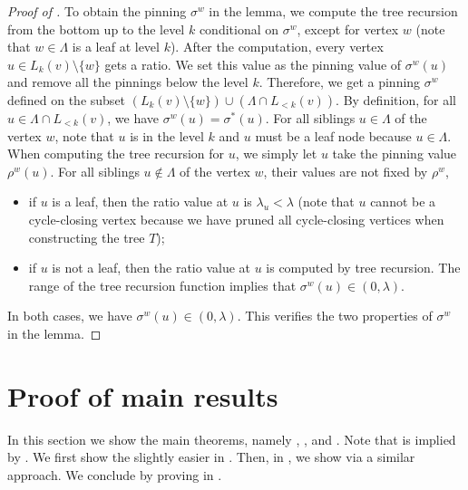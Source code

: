 \documentclass[11pt]{amsart}
\theoremstyle{definition}
\theoremstyle{remark}
\begin{document}
\begin{proof}[Proof of ]
To obtain the pinning $\sigma^w$ in the lemma, we compute the tree recursion from the bottom up to the level $k$ conditional on $\sigma^w$, except for vertex $w$ (note that $w \in \Lambda$ is a leaf at level $k$). After the computation, every vertex $u \in L_k(v) \setminus \{w\}$ gets a ratio. We set this value as the pinning value of $\sigma^w(u)$ and remove all the pinnings below the level $k$. 
Therefore, we get a pinning $\sigma^w$ defined on the subset $(L_k(v) \setminus \{w\}) \cup (\Lambda \cap L_{<k}(v))$. By definition, for all $u \in \Lambda \cap L_{<k}(v)$, we have $\sigma^w(u) = \sigma^*(u)$. For all siblings $u \in \Lambda$ of the vertex $w$, note that $u$ is in the level $k$ and $u$ must be a leaf node because $u \in \Lambda$. When computing the tree recursion for $u$, we simply let $u$ take the pinning value $\rho^w(u)$. 
For all siblings $u \not\in \Lambda$ of the vertex $w$, their values are not fixed by $\rho^w$, 
\begin{itemize}
  \item if $u$ is a leaf, then the ratio value at $u$ is $\lambda_u < \lambda$ (note that $u$ cannot be a cycle-closing vertex because we have pruned all cycle-closing vertices when constructing the tree $T$);
    \item if $u$ is not a leaf, then the ratio value at $u$ is computed by tree recursion. The range of the tree recursion function implies that $\sigma^w(u) \in (0,\lambda)$.
\end{itemize}
In both cases, we have $\sigma^w(u) \in (0,\lambda)$.
This verifies the two properties of $\sigma^w$ in the lemma.
\end{proof}

\section{Proof of main results}\label{sec:proof-of-main-results}

In this section we show the main theorems, namely , , and .
Note that  is implied by .
We first show the slightly easier  in .
Then, in , we show  via a similar approach.
We conclude by proving  in .
\end{document}
